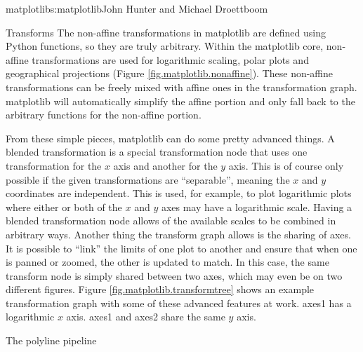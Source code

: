 \begin{aosachapter}{matplotlib}{s:matplotlib}{John Hunter and Michael Droettboom}
\begin{aosasect1}{Transforms}
The non-affine transformations in matplotlib are defined using Python
functions, so they are truly arbitrary.  Within the matplotlib core,
non-affine transformations are used for logarithmic scaling, polar
plots and geographical projections (Figure
\ref{fig.matplotlib.nonaffine}).  These non-affine transformations can
be freely mixed with affine ones in the transformation graph.
matplotlib will automatically simplify the affine portion and only
fall back to the arbitrary functions for the non-affine portion.


From these simple pieces, matplotlib can do some pretty advanced
things.  A blended transformation is a special transformation node
that uses one transformation for the $x$ axis and another for the $y$
axis.  This is of course only possible if the given transformations
are ``separable'', meaning the $x$ and $y$ coordinates are
independent.  This is used, for example, to plot logarithmic plots
where either or both of the $x$ and $y$ axes may have a logarithmic
scale.  Having a blended transformation node allows of the available
scales to be combined in arbitrary ways.  Another thing the transform
graph allows is the sharing of axes.  It is possible to ``link'' the
limits of one plot to another and ensure that when one is panned or
zoomed, the other is updated to match.  In this case, the same
transform node is simply shared between two axes, which may even be on
two different figures.  Figure \ref{fig.matplotlib.transformtree}
shows an example transformation graph with some of these advanced
features at work.  axes1 has a logarithmic $x$ axis.  axes1 and axes2
share the same $y$ axis.


\end{aosasect1}

\begin{aosasect1}{The polyline pipeline}


\end{aosasect1}
\end{aosachapter}
